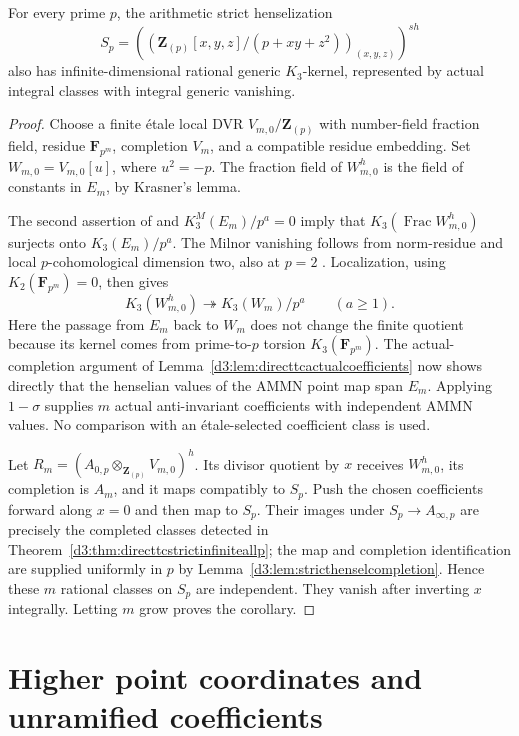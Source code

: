 \begin{corollary}\label{d3:cor:directtcstrictarithmeticallp}
For every prime $p$, the arithmetic strict henselization
\[
 S_p=\left(\left(\mathbf Z_{(p)}[x,y,z]/(p+xy+z^2)\right)
                         _{(x,y,z)}\right)^{sh}
\]
also has infinite-dimensional rational generic $K_3$-kernel,
represented by actual integral classes with integral generic vanishing.
\end{corollary}
\begin{proof}
Choose a finite \'etale local DVR $V_{m,0}/\mathbf Z_{(p)}$ with
number-field fraction field, residue $\mathbf F_{p^m}$, completion
$V_m$, and a compatible residue embedding. Set $W_{m,0}=V_{m,0}[u]$,
where $u^2=-p$. The fraction field of $W_{m,0}^h$ is the field of
constants in $E_m$, by Krasner's lemma.

The second assertion of \cite[Theorem~4.13]{LevineIndK3} and
$K_3^M(E_m)/p^a=0$ imply that
$K_3(\operatorname{Frac}W_{m,0}^h)$ surjects onto $K_3(E_m)/p^a$.
The Milnor vanishing follows from norm-residue
\cite[VI, Theorem~4.1]{Weibel} and local
$p$-cohomological dimension two, also at $p=2$
\cite[Chapter~I, discussion preceding Theorem~2.8]{MilneDuality}. Localization, using
$K_2(\mathbf F_{p^m})=0$, then gives
\[
 K_3(W_{m,0}^h)\twoheadrightarrow K_3(W_m)/p^a
 \qquad(a\ge1).
\]
Here the passage from $E_m$ back to $W_m$ does not change the finite
quotient because its kernel comes from prime-to-$p$ torsion
$K_3(\mathbf F_{p^m})$. The actual-completion argument of
Lemma~\ref{d3:lem:directtcactualcoefficients} now shows directly that
the henselian values of the AMMN point map span $E_m$. Applying
$1-\sigma$ supplies $m$ actual anti-invariant coefficients with
independent AMMN values. No comparison with an \'etale-selected
coefficient class is used.

Let $R_m=(A_{0,p}\otimes_{\mathbf Z_{(p)}}V_{m,0})^h$.
Its divisor quotient by $x$ receives $W_{m,0}^h$, its completion is
$A_m$, and it maps compatibly to $S_p$. Push the chosen coefficients
forward along $x=0$ and then map to $S_p$. Their images under
$S_p\to A_{\infty,p}$ are precisely the completed classes detected
in Theorem~\ref{d3:thm:directtcstrictinfiniteallp}; the map and completion
identification are supplied uniformly in $p$ by
Lemma~\ref{d3:lem:stricthenselcompletion}. Hence these $m$ rational
classes on $S_p$ are independent. They vanish after inverting $x$
integrally. Letting $m$ grow proves the corollary.
\end{proof}

\section{Higher point coordinates and unramified coefficients}
\label{d3:sec:higherpointcoordinates}


